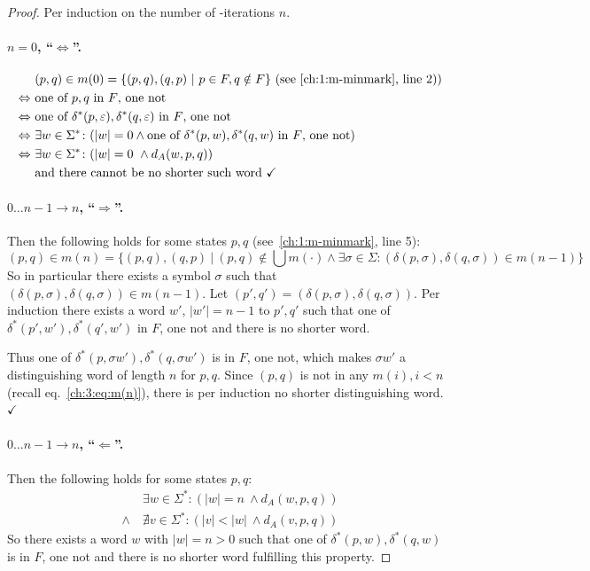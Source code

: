\begin{proof}
	Per induction on the number of \CompDist-iterations $n$.
	
	\paragraph*{$n = 0$, ``$\Leftrightarrow$''.}
	\begin{align*}
		&(p,q) \in m(0) = \{ (p,q), (q,p)\ |\ p \in F, q \notin F \}\hfill\text{ (see~\ref{ch:1:m-minmark}, line 2))}\\
		\Leftrightarrow\ &\text{one of $p,q$ in $F$, one not}\\
		\Leftrightarrow\ &\text{one of $\delta^*(p, \varepsilon),\delta^*(q, \varepsilon)$ in $F$, one not}\\
		\Leftrightarrow\ &\exists w\in\Sigma^*\colon (|w|=0\land\text{one of $\delta^*(p, w),\delta^*(q, w)$ in $F$, one not})\\
		\Leftrightarrow\ &\exists w\in\Sigma^*\colon (|w| = 0\ \land d_A(w, p, q))\\
		&\text{and there cannot be no shorter such word }\checkmark
	\end{align*}
	
	\paragraph*{$0\ldots n-1 \rightarrow n$, ``$\Rightarrow$''.} 
	Then the following holds for some states $p,q$ (see~\ref{ch:1:m-minmark}, line 5):
	\begin{equation}\label{ch:3:eq:m(n)}
		(p,q) \in m(n) = \{ (p,q), (q,p)\ |\ (p,q) \notin \bigcup{m(\cdot)} \land \exists \sigma \in \Sigma \colon (\delta(p,\sigma), \delta(q,\sigma)) \in m(n-1) \}
	\end{equation}
	So in particular there exists a symbol $\sigma$ such that $(\delta(p,\sigma),\delta(q,\sigma)) \in m(n-1)$. Let $(p',q')=(\delta(p,\sigma),\delta(q,\sigma))$. Per induction there exists a word $w'$, $|w'|=n-1$ to $p',q'$ such that one of $\delta^*(p', w'),\delta^*(q', w')$ in $F$, one not and there is no shorter word.
	
	Thus one of $\delta^*(p, \sigma w'),\delta^*(q, \sigma w')$ is in $F$, one not, which makes $\sigma w'$ a distinguishing word of length $n$ for $p,q$. Since $(p,q)$ is not in any $m(i), i<n$ (recall eq.~\ref{ch:3:eq:m(n)}), there is per induction no shorter distinguishing word.\ $\checkmark$ 
	
	\paragraph*{$0\ldots n-1 \rightarrow n$, ``$\Leftarrow$''.} 
	Then the following holds for some states $p,q$:
	\begin{align*}
	&\exists w\in\Sigma^*\colon (|w| = n\ \land d_A(w, p, q))\\
	\land\ &\nexists v\in\Sigma^*\colon (|v| < |w|\ \land d_A(v, p, q))
	\end{align*}
	So there exists a word $w$ with $|w|=n>0$ such that one of $\delta^*(p, w),\delta^*(q, w)$ is in $F$, one not and there is no shorter word fulfilling this property.
	

\end{proof}
